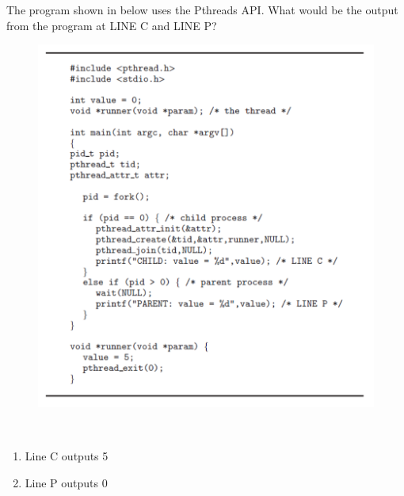 \begin{exercise}[]{The program shown in below uses the Pthreads API. What would be the output from the program at LINE C and LINE P?   
    \begin{figure}[t]
        \begin{center}
            \includegraphics[scale=0.8]{aa1.pdf}
        \end{center}
    \end{figure}}
  \begin{solution}
  \par{~}
  \begin{enumerate}
      \item Line C outputs 5
      \item Line P outputs 0
  \end{enumerate}
  \end{solution}
  \label{ex3}
\end{exercise}


